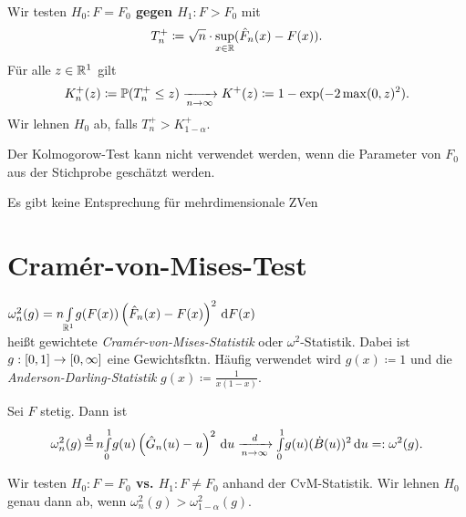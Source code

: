 \documentclass{cheat-sheet}
\renewcommand{\P}{\mathbb{P}} %
\DeclareMathOperator*{\eqqd}{\stackrel{d}{=}} %
\newcommand{\testh}[1]{\textcolor{TestColor}{\textbf{#1}}}
\begin{document}
\begin{test} \mbox{}\\
  Wir testen \testh{$H_0 : F = F_0$ gegen $H_1 : F > F_0$} mit %
  \[ T_n^{+} \coloneqq \sqrt{n} \cdot \sup_{x \in \mathbb{R}} (\hat{F}_n(x) - F(x)). \]
  Für alle $z \in \mathbb{R}^1$ gilt
  \[ K_n^{+}(z) \coloneqq \P(T_n^{+} \leq z) \xra[n \to \infty]{} K^{+}(z) \coloneqq 1 - \exp(-2 \max(0, z)^2). \]
  Wir lehnen $H_0$ ab, falls $T_n^{+} > K^+_{1-\alpha}$.
\end{test}

\begin{acht}
  Der Kolmogorow-Test kann nicht verwendet werden, wenn die Parameter von $F_0$ aus der Stichprobe geschätzt werden.
\end{acht}

\begin{bem}
  Es gibt keine Entsprechung für mehrdimensionale ZVen
\end{bem}

\section{Cramér-von-Mises-Test}



\begin{defn}
  $\omega_n^2(g) = n {\textstyle \int\limits_{\mathbb{R}^1}^{}} g(F(x)) \left( \hat{F}_n(x) - F(x) \right)^2 \,\mathrm{d} F(x)$ \\
  heißt gewichtete \emph{Cramér-von-Mises-Statistik} oder $\omega^2$-Statistik.
  Dabei ist $g : \left[ 0, 1 \right] \to \left[ 0, \infty \right]$ eine Gewichtsfktn.
  Häufig verwendet wird
  $g(x) \coloneqq 1$
  und die \emph{Anderson-Darling-Statistik} $g(x) \coloneqq \tfrac{1}{x (1-x)}$.
\end{defn}

\begin{satz}
  Sei $F$ stetig.
  Dann ist
  \[
    \omega_n^2(g) \eqqd n \Int{0}{1}{g(u) \left( \hat{G}_n(u) - u \right)^2}{u}
    \xra[n \to \infty]{d} \Int{0}{1}{g(u) (\dot{B}(u))^2}{u} =: \omega^2(g).
  \]
\end{satz}

\begin{entscheidungsregel}
  Wir testen \testh{$H_0 : F = F_0$ vs. $H_1 : F \neq F_0$} anhand der CvM-Statistik.
  Wir lehnen $H_0$ genau dann ab, wenn $\omega_n^2(g) > \omega_{1-\alpha}^2(g)$.
\end{entscheidungsregel}
\end{document}
